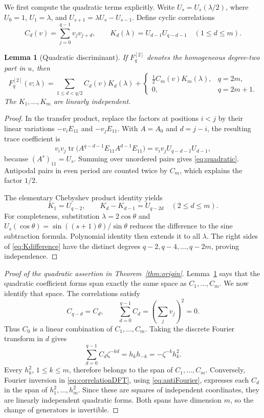 \documentclass[11pt,a4paper]{article}
\newtheorem{lemma}{Lemma}[section]
\theoremstyle{definition}
\theoremstyle{remark}
\newcommand{\tr}{\operatorname{tr}}
\begin{document}
We first compute the quadratic terms explicitly. Write
$U_s=U_s(\lambda/2)$, where $U_0=1$, $U_1=\lambda$, and
$U_{s+1}=\lambda U_s-U_{s-1}$. Define cyclic correlations
\[
 C_d(v)=\sum_{j=0}^{q-1}v_jv_{j+d},\qquad
 K_d(\lambda)=U_{d-1}U_{q-d-1}\quad(1\leq d\leq m).
\]

\begin{lemma}[Quadratic discriminant]\label{lem:quadratic}
If $F_q^{[2]}$ denotes the homogeneous degree-two part in $u$, then
\begin{equation}\label{eq:quadratic}
 F_q^{[2]}(v;\lambda)=
 \sum_{1\leq d<q/2}C_d(v)K_d(\lambda)
 +\begin{cases}\frac12 C_m(v)K_m(\lambda),&q=2m,\\0,&q=2m+1.
 \end{cases}
\end{equation}
The $K_1,\ldots,K_m$ are linearly independent.
\end{lemma}
\begin{proof}
In the transfer product, replace the factors at positions $i<j$ by their
linear variations $-v_iE_{11}$ and $-v_jE_{11}$. With $A=A_0$ and $d=j-i$,
the resulting trace coefficient is
\[
 v_iv_j\tr\bigl(A^{q-d-1}E_{11}A^{d-1}E_{11}\bigr)
   =v_iv_jU_{q-d-1}U_{d-1},
\]
because $(A^s)_{11}=U_s$. Summing over unordered pairs gives
\eqref{eq:quadratic}. Antipodal pairs in even period are counted twice by
$C_m$, which explains the factor $1/2$.

The elementary Chebyshev product identity yields
\begin{equation}\label{eq:Kdifference}
 K_1=U_{q-2},\qquad K_d-K_{d-1}=U_{q-2d}\quad(2\leq d\leq m).
\end{equation}
For completeness, substitution $\lambda=2\cos\theta$ and
$U_s(\cos\theta)=\sin((s+1)\theta)/\sin\theta$ reduces the difference
to the sine subtraction formula. Polynomial identity then extends it to
all $\lambda$. The right sides of \eqref{eq:Kdifference} have the distinct
degrees $q-2,q-4,\ldots,q-2m$, proving independence.
\end{proof}

\begin{proof}[Proof of the quadratic assertion in Theorem~\ref{thm:origin}]
Lemma~\ref{lem:quadratic} says that the quadratic coefficient forms span
exactly the same space as $C_1,\ldots,C_m$. We now identify that space.
The correlations satisfy
\[
 C_{q-d}=C_d,\qquad
 \sum_{d=0}^{q-1}C_d=\left(\sum_jv_j\right)^2=0.
\]
Thus $C_0$ is a linear combination of $C_1,\ldots,C_m$.
Taking the discrete Fourier transform in $d$ gives
\begin{equation}\label{eq:correlationDFT}
 \sum_{d=0}^{q-1}C_d\zeta^{-kd}=h_kh_{-k}
        =-\zeta^{-k}h_k^2.
\end{equation}
Every $h_k^2$, $1\leq k\leq m$, therefore belongs to the span of
$C_1,\ldots,C_m$. Conversely, Fourier inversion in
\eqref{eq:correlationDFT}, using \eqref{eq:antiFourier}, expresses each
$C_d$ in the span of $h_1^2,\ldots,h_m^2$. Since these are squares of
independent coordinates, they are linearly independent quadratic forms.
Both spans have dimension $m$, so the change of generators is invertible.
\end{proof}
\end{document}
